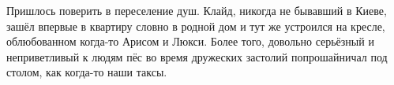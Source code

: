  
 
 
 
 


Пришлось поверить в переселение душ. Клайд, никогда не бывавший в Киеве, зашёл
впервые в квартиру словно в родной дом и тут же устроился на кресле,
облюбованном когда-то Арисом и Люкси. Более того, довольно серьёзный и
неприветливый к людям пёс во время дружеских застолий попрошайничал под столом,
как когда-то наши таксы.
